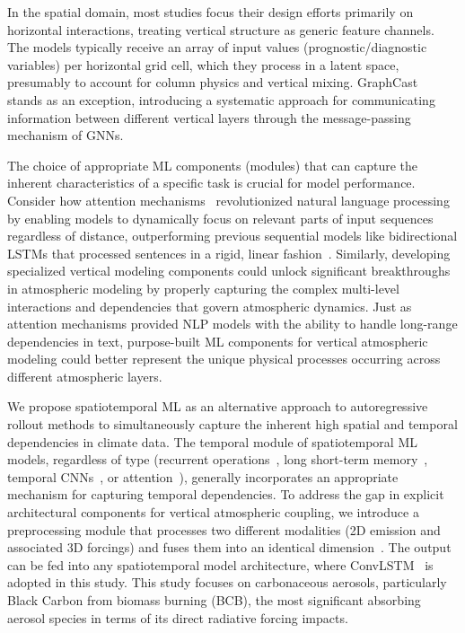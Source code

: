 \documentclass{article}
\begin{document}
    In the spatial domain, most studies focus their design efforts primarily on horizontal interactions, treating vertical structure as generic feature channels. The models typically receive an array of input values (prognostic/diagnostic variables) per horizontal grid cell, which they process in a latent space, presumably to account for column physics and vertical mixing. GraphCast~\cite{lam2023learning} stands as an exception, introducing a systematic approach for communicating information between different vertical layers through the message-passing mechanism of GNNs.

    The choice of appropriate ML components (modules) that can capture the inherent characteristics of a specific task is crucial for model performance. Consider how attention mechanisms~\cite{vaswani2017attention} revolutionized natural language processing by enabling models to dynamically focus on relevant parts of input sequences regardless of distance, outperforming previous sequential models like bidirectional LSTMs that processed sentences in a rigid, linear fashion~\cite{peters2018deep}. Similarly, developing specialized vertical modeling components could unlock significant breakthroughs in atmospheric modeling by properly capturing the complex multi-level interactions and dependencies that govern atmospheric dynamics. Just as attention mechanisms provided NLP models with the ability to handle long-range dependencies in text, purpose-built ML components for vertical atmospheric modeling could better represent the unique physical processes occurring across different atmospheric layers.

    We propose spatiotemporal ML as an alternative approach to autoregressive rollout methods to simultaneously capture the inherent high spatial and temporal dependencies in climate data. The temporal module of spatiotemporal ML models, regardless of type (recurrent operations~\cite{elman1990finding}, long short-term memory~\cite{graves2012long}, temporal CNNs~\cite{bai2018empirical}, or attention~\cite{vaswani2017attention}), generally incorporates an appropriate mechanism for capturing temporal dependencies. To address the gap in explicit architectural components for vertical atmospheric coupling, we introduce a preprocessing module that processes two different modalities (2D emission and associated 3D forcings) and fuses them into an identical dimension~\cite{tan2023temporal, wang2018recovering}. The output can be fed into any spatiotemporal model architecture, where ConvLSTM~\cite{shi2015convolutional} is adopted in this study. This study focuses on carbonaceous aerosols, particularly Black Carbon from biomass burning (BCB), the most significant absorbing aerosol species in terms of its direct radiative forcing impacts.
    
\end{document}
